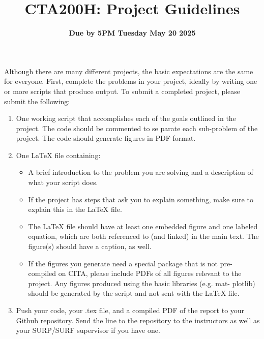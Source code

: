 \documentclass{article}
\title{CTA200H: Project Guidelines}
\author{}
\date{\bf Due by 5PM Tuesday May 20 2025}
\begin{document}
\maketitle


Although there are many different projects, the basic expectations are the same for everyone. First, complete the problems in your project, ideally by writing one or more scripts that produce output.
To submit a completed project, please submit the following:

\begin{enumerate}
\item
  One working script that accomplishes each of the goals outlined in the project. The code should be commented to se
  parate each sub-problem of the project. The code should generate figures in PDF format.
\item One LaTeX file containing:
  \begin{itemize}
\item A brief introduction to the problem you are solving and a description of what your script does.
\item If the project has steps that ask you to explain something, make sure to explain this in the LaTeX file.
\item The LaTeX file should have at least one embedded figure and one labeled equation, which are both referenced to (and linked) in the main text. The figure(s) should have a caption, as well.
\item If the figures you generate need a special package that is not pre- compiled on CITA, please include PDFs of all figures relevant to the project. Any figures produced using the basic libraries (e.g. mat- plotlib) should be generated by the script and not sent with the LaTeX file.
  \end{itemize}
\item Push your code, your .tex file, and a compiled PDF of the report to your Github repository. Send the line to the repository to the instructors as well as your SURP/SURF supervisor if you have one.
\end{enumerate}
\end{document}
